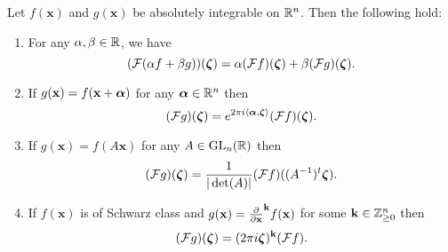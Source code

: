      \begin{proposition}\label{prop:Fourier_transform_properties}
        Let $f(\mathbf{x})$ and $g(\mathbf{x})$ be absolutely integrable on $\mathbb{R}^{n}$. Then the following hold:
        \begin{enumerate}[label*=(\roman*)]
          \item For any $\alpha,\beta \in \mathbb{R}$, we have
          \[
            (\mathcal{F}(\alpha f+\beta g))(\boldsymbol{\zeta}) = \alpha(\mathcal{F}f)(\boldsymbol{\zeta})+\beta(\mathcal{F}g)(\boldsymbol{\zeta}).
          \]
          \item If $g(\mathbf{x}) = f(\mathbf{x}+\boldsymbol{\alpha})$ for any $\boldsymbol{\alpha} \in \mathbb{R}^{n}$ then
          \[
            (\mathcal{F}g)(\boldsymbol{\zeta}) = e^{2\pi i\langle\boldsymbol{\alpha},\boldsymbol{\zeta}\rangle}(\mathcal{F}f)(\boldsymbol{\zeta}).
          \]
          \item If $g(\mathbf{x}) = f(A\mathbf{x})$ for any $A \in \mathrm{GL}_{n}(\mathbb{R})$ then
          \[
            (\mathcal{F}g)(\boldsymbol{\zeta}) = \frac{1}{|\det(A)|}(\mathcal{F}f)((A^{-1})^{t}\boldsymbol{\zeta}).
          \]
          \item If $f(\mathbf{x})$ is of Schwarz class and $g(\mathbf{x}) = \frac{\partial}{\partial \mathbf{x}}^{\mathbf{k}}f(\mathbf{x})$ for some $\mathbf{k} \in \mathbb{Z}_{\ge 0}^{n}$ then
          \[
            (\mathcal{F}g)(\boldsymbol{\zeta}) = (2\pi i\boldsymbol{\zeta})^{\mathbf{k}}(\mathcal{F}f).
          \]
        \end{enumerate}
      \end{proposition}

